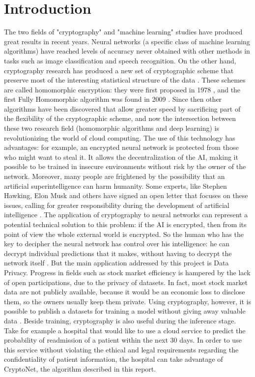 \section{Introduction}

The two fields of "cryptography" and "machine learning" studies have produced great results in recent years. Neural networks (a specific class of machine learning algorithms) have reached levels of accuracy never obtained with other methods in tasks such as image classification and speech recognition. On the other hand, cryptography research has produced a new set of cryptographic scheme that preserve most of the interesting statistical structure of the data \cite{safeai}. These schemes are called homomorphic encryption: they were first proposed in 1978 \cite{firstHomEnc}, and the first Fully Homomorphic algorithm was found in 2009 \cite{10.1007/978-3-642-29011-4_28}. Since then other algorithms have been discovered that allow greater speed by sacrificing part of the flexibility of the cryptographic scheme, and now the intersection between these two research field (homomorphic algorithms and deep learning) is revolutionizing the world of cloud computing. The use of this technology has advantages: for example, an encrypted neural network is protected from those who might want to steal it. It allows the decentralization of the AI, making it possible to be trained in insecure environments without risk by the owner of the network. Moreover, many people are frightened by the possibility that an artificial superintelligence can harm humanity. Some experts, like Stephen Hawking, Elon Musk and others have signed an open letter that focuses on these issues, calling for greater responsibility during the development of artificial intelligence \cite{open-letter}. The application of cryptography to neural networks can represent a potential technical solution to this problem: if the AI is encrypted, then from its point of view the whole external world is encrypted. So the human who has the key to decipher the neural network has control over his intelligence: he can decrypt individual predictions that it makes, without having to decrypt the network itself \cite{safeai}. But the main application addressed by this project is Data Privacy. Progress in fields such as stock market efficiency is hampered by the lack of open participations, due to the privacy of datasets. In fact, most stock market data are not publicly available, because it would be an economic loss to disclose them, so the owners usually keep them private. Using cryptography, however, it is possible to publish a datasets for training a model without giving away valuable data \cite{numerai}. Beside training, cryptography is also useful during the inference stage. Take for example a hospital that would like to use a cloud service to predict the probability of readmission of a patient within the next 30 days. In order to use this service without violating the ethical and legal requirements regarding the confidentiality of patient information, the hospital can take advantage of CryptoNet, the algorithm described in this report.

